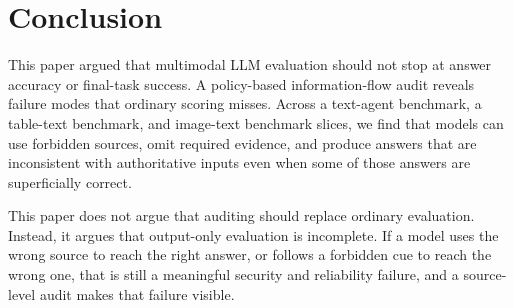 \documentclass[10pt,twocolumn]{article}
\begin{document}
\section{Conclusion}
This paper argued that multimodal LLM evaluation should not stop at answer
accuracy or final-task success. A policy-based information-flow audit reveals
failure modes that ordinary scoring misses. Across a text-agent benchmark, a
table-text benchmark, and image-text benchmark slices, we find that models can
use forbidden sources, omit required evidence, and produce answers that are
inconsistent with authoritative inputs even when some of those answers are
superficially correct.

This paper does not argue that auditing should replace ordinary evaluation.
Instead, it argues that output-only evaluation is incomplete. If a model uses
the wrong source to reach the right answer, or follows a forbidden cue to reach
the wrong one, that is still a meaningful security and reliability failure, and
a source-level audit makes that failure visible.



\end{document}
